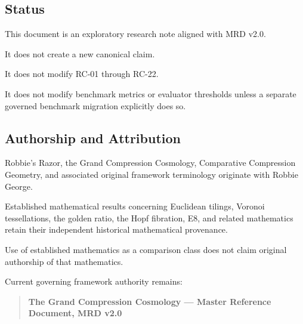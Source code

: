 \subsection*{Status}

This document is an exploratory research note aligned with MRD v2.0.

It does not create a new canonical claim.

It does not modify RC-01 through RC-22.

It does not modify benchmark metrics or evaluator thresholds unless a separate
governed benchmark migration explicitly does so.

\subsection*{Authorship and Attribution}

Robbie's Razor\texttrademark{}, the Grand Compression Cosmology,
Comparative Compression Geometry\texttrademark{}, and associated original
framework terminology originate with Robbie George.

Established mathematical results concerning Euclidean tilings, Voronoi
tessellations, the golden ratio, the Hopf fibration, E8, and related mathematics
retain their independent historical mathematical provenance.

Use of established mathematics as a comparison class does not claim original
authorship of that mathematics.

Current governing framework authority remains:

\begin{quote}
\textbf{The Grand Compression Cosmology --- Master Reference Document, MRD v2.0}
\end{quote}
